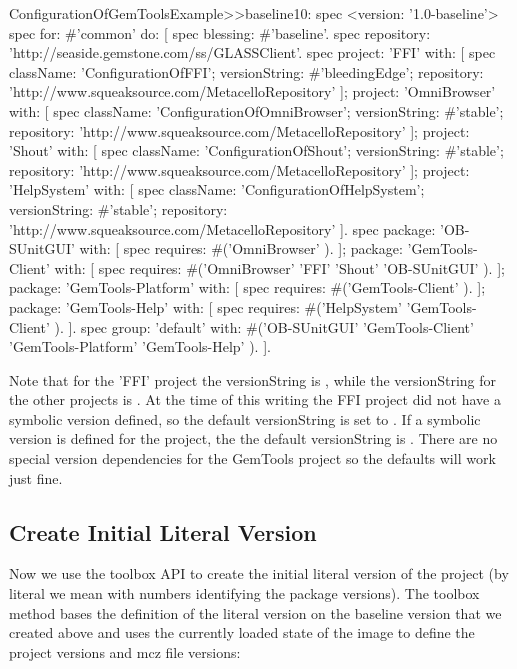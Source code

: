 \documentclass[a4paper,10pt,twoside]{book}
\begin{document}
\begin{code}{}
ConfigurationOfGemToolsExample>>baseline10: spec
  <version: '1.0-baseline'>
  spec for: #'common' do: [
    spec blessing: #'baseline'.
    spec repository: 'http://seaside.gemstone.com/ss/GLASSClient'.
    spec
      project: 'FFI' with: [
        spec
          className: 'ConfigurationOfFFI';
          versionString: #'bleedingEdge';
          repository: 'http://www.squeaksource.com/MetacelloRepository' ];
      project: 'OmniBrowser' with: [
        spec
          className: 'ConfigurationOfOmniBrowser';
          versionString: #'stable';
          repository: 'http://www.squeaksource.com/MetacelloRepository' ];
      project: 'Shout' with: [
        spec
          className: 'ConfigurationOfShout';
          versionString: #'stable';
          repository: 'http://www.squeaksource.com/MetacelloRepository' ];
      project: 'HelpSystem' with: [
        spec
          className: 'ConfigurationOfHelpSystem';
          versionString: #'stable';
          repository: 'http://www.squeaksource.com/MetacelloRepository' ].
    spec
      package: 'OB-SUnitGUI' with: [
        spec requires: #('OmniBrowser' ). ];
      package: 'GemTools-Client' with: [
        spec requires: #('OmniBrowser' 'FFI' 'Shout' 'OB-SUnitGUI' ). ];
      package: 'GemTools-Platform' with: [
        spec requires: #('GemTools-Client' ). ];
      package: 'GemTools-Help' with: [
        spec requires: #('HelpSystem' 'GemTools-Client' ). ].
    spec group: 'default' with: #('OB-SUnitGUI' 'GemTools-Client'
          'GemTools-Platform' 'GemTools-Help' ). ].
\end{code}          



Note that for the 'FFI' project the versionString is , while the versionString for the other projects is . At the time of this writing the FFI project did not have a  symbolic version defined, so the default versionString is set to . If a  symbolic version is defined for the project, the the default versionString is . There are no special version dependencies for the GemTools project so the defaults will work just fine.



\subsection{Create Initial Literal Version}

Now we use the toolbox API to create the initial literal version of the project (by literal we mean with numbers identifying the package versions). The toolbox method  bases the definition of the literal version on the baseline version that we created above and uses the currently loaded state of the image to define the project versions and mcz file versions:
\end{document}
